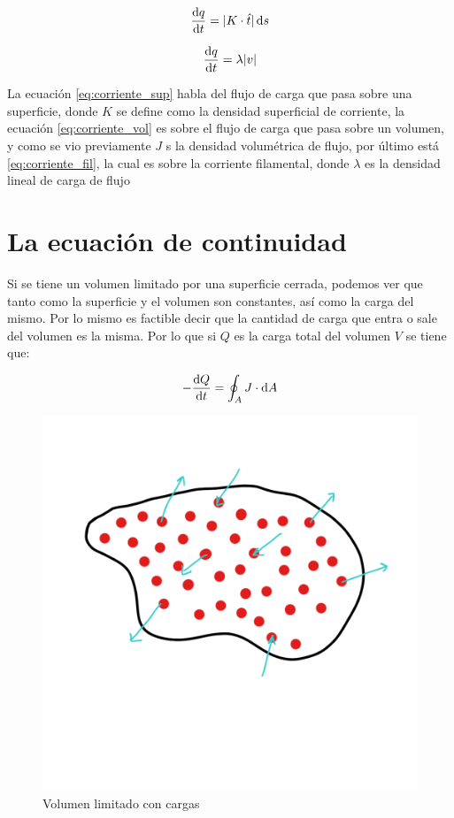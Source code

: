 \documentclass[11pt]{report}
\theoremstyle{plain}
\theoremstyle{definition}
\begin{document}
\begin{equation}
	\dv{q}{t} = |K \cdot \hat{t}| \dd{s}
	\label{eq:corriente_sup}
\end{equation}	
	
	
\begin{equation}
	\dv{q}{t} = \lambda|v|
	\label{eq:corriente_fil}
\end{equation}


La ecuación \ref{eq:corriente_sup} habla del flujo de carga que pasa sobre una superficie, donde $K$ se define como la densidad superficial de corriente, la ecuación \ref{eq:corriente_vol} es sobre el flujo de carga que pasa sobre un volumen, y como se vio previamente $J$ s la densidad volumétrica de flujo, por último está \ref{eq:corriente_fil}, la cual es sobre la corriente filamental, donde $\lambda$ es la densidad lineal de carga de flujo
\section*{La ecuación de continuidad}

Si se tiene un volumen limitado por una superficie cerrada, podemos ver que tanto como la superficie y el volumen son constantes, así como la carga del mismo. Por lo mismo es factible decir que la cantidad de carga que entra o sale del volumen es la misma. Por lo que si $Q$ es la carga total del volumen $V$ se tiene que:

\begin{equation}
	-\dv{Q}{t} = \oint_A J \cdot \dd{A}
\end{equation}


\begin{figure}[!h]
	\centering
	\includegraphics[scale=0.15]{ecuacion_continuidad.png}
	\caption{Volumen limitado con cargas}
	\label{fig:ecuacion_continuidad}
\end{figure}
\end{document}
